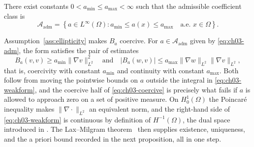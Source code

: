 \begin{assumption}
\label{ass:ellipticity}
There exist constants $0 < a_{\min} \le a_{\max} < \infty$ such that the
admissible coefficient class is
\begin{equation}
  \mathcal{A}_{\text{adm}} = \left\{ a \in L^\infty(\Omega) : a_{\min} \le a(x) \le a_{\max} \quad \text{a.e. } x \in \Omega \right\}.
  \label{eq:ch03-adm}
\end{equation}
\end{assumption}

Assumption~\ref{ass:ellipticity} makes $B_a$ coercive.
For $a \in \mathcal{A}_{\text{adm}}$ given by \eqref{eq:ch03-adm}, the form
satisfies the pair of estimates
\begin{equation}
  B_a(v,v) \ge a_{\min} \|\nabla v\|_{L^2}^2
  \quad \text{and} \quad
  |B_a(w, v)| \le a_{\max} \|\nabla w\|_{L^2} \|\nabla v\|_{L^2},
  \label{eq:ch03-coercive}
\end{equation}
that is, coercivity with constant $a_{\min}$ and continuity with constant
$a_{\max}$. Both follow from moving the pointwise bounds on $a$ outside the
integral in \eqref{eq:ch03-weakform}, and the coercive half of
\eqref{eq:ch03-coercive} is precisely what fails if $a$ is allowed to approach
zero on a set of positive measure. On $H^1_0(\Omega)$ the Poincar{\'e}
inequality makes
$\|\nabla \cdot\|_{L^2}$ an equivalent norm, and the right-hand side of
\eqref{eq:ch03-weakform} is continuous by definition of $H^{-1}(\Omega)$, the
dual space introduced in .
The Lax--Milgram theorem~\cite{brezis2011functional, evans2010partial}
then supplies existence, uniqueness, and the a priori bound recorded in the next
proposition, all in one step.

